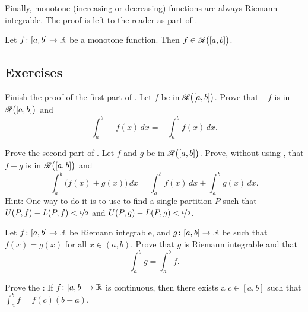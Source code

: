 Finally, monotone (increasing or decreasing) functions are always
Riemann integrable.  The proof is left to the reader as part of
.

\begin{prop} \label{prop:monotoneintegrable}
Let $f \colon [a,b] \to {\mathbb{R}}$ be a monotone function.  Then $f \in
{\mathscr{R}}\bigl([a,b]\bigr)$.
\end{prop}

\subsection{Exercises}

\begin{exercise} \label{exercise:proofoflinpropparti}
Finish the proof of the first part of .
Let $f$ be in ${\mathscr{R}}\bigl([a,b]\bigr)$.  Prove that
$-f$ is in ${\mathscr{R}}\bigl([a,b]\bigr)$ and 
\begin{equation*}
\int_a^b - f(x) \,dx = - \int_a^b f(x) \,dx .
\end{equation*}
\end{exercise}

\begin{exercise} \label{exercise:proofoflinproppartii}
Prove the second part of .
Let $f$ and $g$ be in ${\mathscr{R}}\bigl([a,b]\bigr)$.
Prove, without using , that $f+g$ is in
${\mathscr{R}}\bigl([a,b]\bigr)$ and
\begin{equation*}
\int_a^b \bigl( f(x)+g(x) \bigr) \,dx = 
\int_a^b f(x) \,dx 
+
\int_a^b g(x) \,dx .
\end{equation*}
Hint: One way to do it is to use  to find a single partition $P$
such that $U(P,f)-L(P,f) < \nicefrac{\epsilon}{2}$ and
$U(P,g)-L(P,g) < \nicefrac{\epsilon}{2}$.
\end{exercise}

\begin{exercise} \label{exercise:changeendpointsintegral}
Let $f \colon [a,b] \to {\mathbb{R}}$ be Riemann integrable, and $g \colon [a,b] \to {\mathbb{R}}$
be such that $f(x) = g(x)$ for all $x \in (a,b)$.
Prove that $g$ is Riemann integrable and that
\begin{equation*}
\int_a^b g = \int_a^b f.
\end{equation*}
\end{exercise}

\begin{exercise}
Prove the \emph{}:
If $f \colon [a,b] \to {\mathbb{R}}$ is continuous, then there exists
a $c \in [a,b]$ such that $\int_a^b f = f(c)(b-a)$.
\end{exercise}

